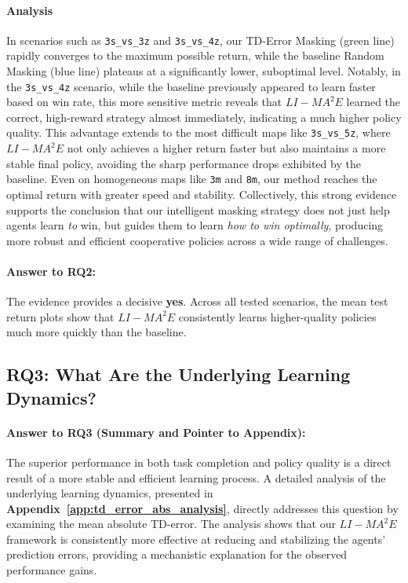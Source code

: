 \paragraph{Analysis}
In scenarios such as \texttt{3s\_vs\_3z} and \texttt{3s\_vs\_4z}, our TD-Error Masking (green line) rapidly converges to the maximum possible return, while the baseline Random Masking (blue line) plateaus at a significantly lower, suboptimal level. Notably, in the \texttt{3s\_vs\_4z} scenario, while the baseline previously appeared to learn faster based on win rate, this more sensitive metric reveals that $LI-{MA}^2E$ learned the correct, high-reward strategy almost immediately, indicating a much higher policy quality. This advantage extends to the most difficult maps like \texttt{3s\_vs\_5z}, where  $LI-{MA}^2E$ not only achieves a higher return faster but also maintains a more stable final policy, avoiding the sharp performance drops exhibited by the baseline. Even on homogeneous maps like \texttt{3m} and \texttt{8m}, our method reaches the optimal return with greater speed and stability. Collectively, this strong evidence supports the conclusion that our intelligent masking strategy does not just help agents learn \textit{to} win, but guides them to learn \textit{how to win optimally}, producing more robust and efficient cooperative policies across a wide range of challenges.

\paragraph{Answer to RQ2:}
The evidence provides a decisive \textbf{yes}. Across all tested scenarios, the mean test return plots show that  $LI-{MA}^2E$ consistently learns higher-quality policies much more quickly than the baseline. 
\subsection{RQ3: What Are the Underlying Learning Dynamics?}

\paragraph{Answer to RQ3 (Summary and Pointer to Appendix):}
The superior performance in both task completion and policy quality is a direct result of a more stable and efficient learning process. A detailed analysis of the underlying learning dynamics, presented in \textbf{Appendix~\ref{app:td_error_abs_analysis}}, directly addresses this question by examining the mean absolute TD-error. The analysis shows that our $LI-{MA}^2E$ framework is consistently more effective at reducing and stabilizing the agents' prediction errors, providing a mechanistic explanation for the observed performance gains.
